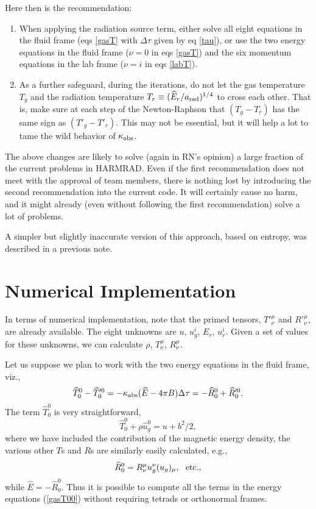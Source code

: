 \documentclass[12pt,preprint]{aastex}
\begin{document}
Here then is the recommendation:
\begin{enumerate}
\item
When applying the radiation source term, either solve all eight
equations in the fluid frame (eqs \ref{gasT} with $\Delta \tau$ given
by eq \ref{tau}), or use the two energy equations in the fluid frame
($\nu=0$ in eqs \ref{gasT}) and the six momentum equations in the lab
frame ($\nu=i$ in eqs \ref{labT}).

\item
As a further safeguard, during the iterations, do not let the gas
temperature $T_g$ and the radiation temperature $T_r \equiv
(\widehat{E}_r/a_{\rm rad})^{1/4}$ to cross each other. That is, make
sure at each step of the Newton-Raphson that $(T_g-T_r)$ has the same
sign as $(T'_g-T'_r)$. This may not be essential, but it will help a
lot to tame the wild behavior of $\kappa_{\rm abs}$.

\end{enumerate}

The above changes are likely to solve (again in RN's opinion) a large
fraction of the current problems in HARMRAD. Even if the first
recommendation does not meet with the approval of team members, there
is nothing lost by introducing the second recommendation into the
current code. It will certainly cause no harm, and it might already
(even without following the first recommendation) solve a lot of
problems.

A simpler but slightly inaccurate version of this approach, based on
entropy, was described in a previous note.

\section{Numerical Implementation}

In terms of numerical implementation, note that the primed tensors,
$T'^\mu_\nu$ and $R'^\mu_\nu$, are already available. The eight
unknowns are $u$, $u^i_g$, $E_r$, $u^i_r$.  Given a set of values for
these unknowns, we can calculate $\rho$, $T^\mu_\nu$, $R^\mu_\nu$.

Let us suppose we plan to work with the two energy equations in the
fluid frame, viz.,
\begin{equation}
\widehat{T}^0_0-\widehat{T}'^0_0 = -\kappa_{\rm abs}(\widehat{E}-4\pi B)
\Delta\tau= -\widehat{R}^0_0+\widehat{R}'^0_0.
\label{gasT00}
\end{equation}
The term $\widehat{T}^0_0$ is very straightforward,
\begin{equation}
\widehat{T}^0_0 + \rho \widehat{u}^0_g = u + b^2/2,
\end{equation}
where we have included the contribution of the magnetic energy
density, the various other $T$s and $R$s are similarly easily
calculated, e.g.,
\begin{equation}
\widehat{R}^0_0 = R^\mu_\nu u^\nu_g (u_g)_\mu, ~~{\rm etc.},
\end{equation}
while $\widehat{E}=-\widehat{R}^0_0$. Thus it is possible to compute
all the terms in the energy equations (\ref{gasT00}) without requiring
tetrads or orthonormal frames.
\end{document}
